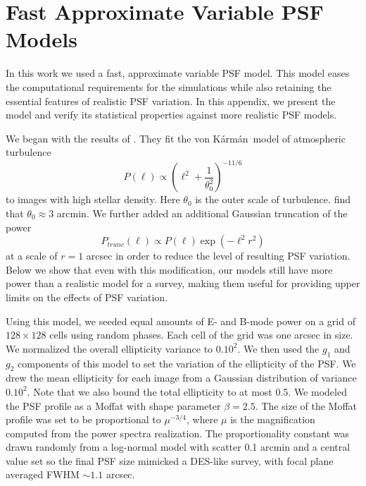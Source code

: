 \documentclass[iop, appendixfloats, numberedappendix, apj]{emulateapj}
\newcommand{\vonkarman}{{von K\'arm\'an}~}
\begin{document}
%
%
%
%



\appendix

\section{Fast Approximate Variable PSF Models}\label{app:pspsf}

In this work we used a fast, approximate variable PSF model. This model eases the
computational requirements for the simulations while also retaining the
essential features of realistic PSF variation. In this appendix, we present
the model and verify its statistical properties against more realistic PSF models.

We began with the results of \citet{heymans2012}. They fit the \vonkarman model
of atmospheric turbulence
\begin{displaymath}
  P(\ell) \propto \left(\ell^{2} + \frac{1}{\theta_{0}^2}\right)^{-11/6}
\end{displaymath}
to images with high stellar density. Here $\theta_{0}$ is the outer scale of
turbulence. \citep{heymans2012} find that $\theta_{0}\approx3$ arcmin.
We further added an additional Gaussian truncation of the power
\begin{displaymath}
  P_{trunc}(\ell) \propto P(\ell)\exp\left(-\ell^2r^{2}\right)
\end{displaymath}
at a scale of $r=1$ arcsec in order to reduce the level of resulting
PSF variation. Below we show that even with this modification, our models
still have more power than a realistic model for a survey, making them useful
for providing upper limits on the effects of PSF variation.

Using this model, we seeded equal amounts of E- and B-mode power on a grid of
$128\times128$ cells using random phases. Each cell of the grid was one
arcsec in size. We normalized the overall ellipticity variance to $0.10^2$. We then used
the $g_1$ and $g_2$ components of this model to set the variation of the ellipticity of
the PSF. We drew the mean ellipticity for each image from a Gaussian distribution of
variance $0.10^2$. Note that we also bound the total ellipticity to at most 0.5.
We modeled the PSF profile as a Moffat with shape parameter $\beta=2.5$.
The size of the Moffat profile was set to be proportional to $\mu^{-3/4}$,
where $\mu$ is the magnification computed from the power spectra realization. The
proportionality constant was drawn randomly from a log-normal model with
scatter 0.1 arcmin and a central value set so the final PSF size mimicked a DES-like
survey, with focal plane averaged FWHM $\sim1.1$ arcsec.
\end{document}
